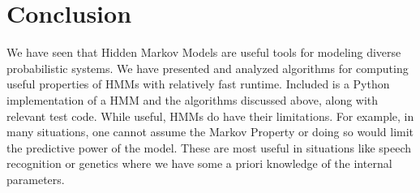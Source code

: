 

\section{Conclusion}
We have seen that Hidden Markov Models are useful tools for modeling diverse probabilistic systems. We have presented and analyzed algorithms for computing useful properties of HMMs with relatively fast runtime. Included is a Python implementation of a HMM and the algorithms discussed above, along with relevant test code. While useful, HMMs do have their limitations. For example, in many situations, one cannot assume the Markov Property or doing so would limit the predictive power of the model. These are most useful in situations like speech recognition or genetics where we have some a priori knowledge of the internal parameters. 